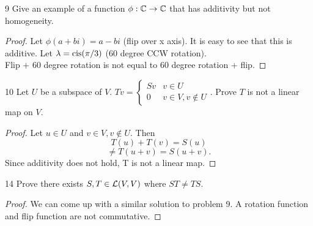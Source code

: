 \documentclass[12pt, letterpaper]{article}
\begin{document}
\begin{problem}
{9}
Give an example of a function $\phi:\mathbb{C}\to\mathbb{C}$ that has
additivity but not homogeneity.
\end{problem}
\begin{proof}
Let $\phi(a+bi)=a-bi$ (flip over x axis). It is easy to see that this is additive.
Let $\lambda=\operatorname{cis}(\pi/3)$ (60 degree CCW rotation).
\\Flip + 60 degree rotation is not equal to 60 degree rotation + flip.
\end{proof}

\begin{problem}
{10}
Let $U$ be a subspace of $V$.
$Tv = 
\begin{cases} 
  Sv & v\in U \\
  0 & v\in V, v\notin U
\end{cases}$.
Prove $T$ is not a linear map on $V$.
\end{problem}
\begin{proof}
Let $u\in U$ and $v\in V,v\notin U$. Then 
$$T(u)+T(v)=S(u)$$
$$\neq T(u+v)=S(u+v).$$
Since additivity does not hold, T is not a linear map.
\end{proof}

\begin{problem}
{14} Prove there exists $S,T\in\mathcal{L}(V,V)$ where $ST\neq TS$.
\end{problem}
\begin{proof}
We can come up with a similar solution to problem 9.
A rotation function and flip function are not commutative.
\end{proof}
\end{document}
